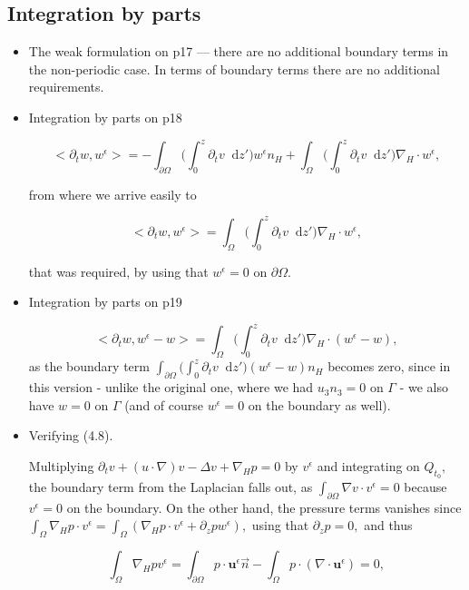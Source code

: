 \documentclass[11pt]{article}
\newcommand*\diff{\mathop{}\!\mathrm{d}}
\begin{document}
\subsection{Integration by parts}

\begin{itemize}

  \item The weak formulation on p17 --- there are no additional boundary terms in the non-periodic case. In terms of boundary terms there are no additional requirements.
  
  \item Integration by parts on p18
  
    $$<\partial_t w, w^\epsilon> = - \int_{\partial \Omega} \bigg ( \int_0^z \partial_t v \diff z' \bigg ) w^\epsilon n_H + \int_\Omega \bigg ( \int_0^z \partial_t v \diff z' \bigg) \nabla_H \cdot w^\epsilon,$$
    
    from where we arrive easily to 
    
     $$<\partial_t w, w^\epsilon> = \int_\Omega \bigg ( \int_0^z \partial_t v \diff z' \bigg) \nabla_H \cdot w^\epsilon,$$
     
     that was required, by using that $w^\epsilon = 0$ on $\partial \Omega.$
     
   \item Integration by parts on p19
   
   $$<\partial_t w, w^\epsilon - w> = \int_\Omega \bigg ( \int_0^z \partial_t v \diff z' \bigg) \nabla_H \cdot (w^\epsilon - w),$$ as the boundary term $\int_{\partial \Omega} \bigg ( \int_0^z \partial_t v \diff z' \bigg ) (w^\epsilon - w) n_H$ becomes zero, since in this version  - unlike the original one, where we had $u_3 n_3 = 0$ on $\Gamma$ - we also have $w = 0$ on $\Gamma$ (and of course $w^\epsilon = 0$ on the boundary as well). 
   
   \item Verifying (4.8).
   
   Multiplying $\partial_t v + (u \cdot \nabla) v - \Delta v + \nabla_H p = 0$ by $v^\epsilon$ and integrating on $Q_{t_0},$ the boundary term from the Laplacian falls out, as $\int_{\partial \Omega} \nabla v \cdot v^\epsilon = 0$ because  $v^\epsilon = 0$ on the boundary. On the other hand, the pressure terms vanishes since $ \int_\Omega \nabla_H p \cdot v^\epsilon = \int_\Omega (\nabla_H p \cdot v^\epsilon + \partial_z p w^\epsilon),$ using that $\partial_z p = 0,$ and thus
   
   $$ \int_\Omega \nabla_H p v^\epsilon = \int_{\partial \Omega} p \cdot \mathbf{u}^\epsilon \vec{n} - \int_\Omega p \cdot ( \nabla \cdot \mathbf{u}^\epsilon) = 0,$$
   

\end{itemize}
\end{document}
